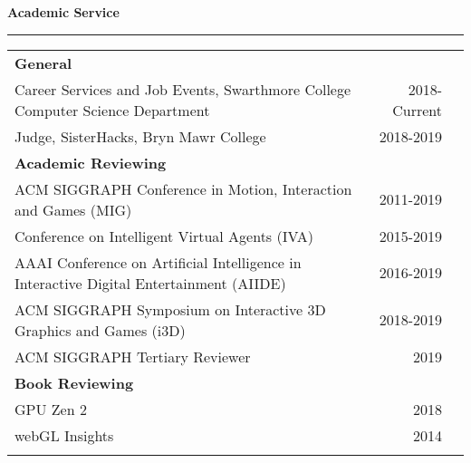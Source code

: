 \needspace{6em}
{\large {\bf Academic Service}}
\vspace{0.1cm}
\hrule
\begin{tabular*}{7.1in}{@{}l@{\extracolsep\fill}r}

{\bf General } & \\
Career Services and Job Events, Swarthmore College Computer Science Department & 2018-Current \\
Judge, SisterHacks, Bryn Mawr College & 2018-2019
\phantom{yommomma} & \phantom{2002}\\

{\bf Academic Reviewing } & \\
ACM SIGGRAPH Conference in Motion, Interaction and Games (MIG) & 2011-2019 \\
Conference on Intelligent Virtual Agents (IVA) & 2015-2019\\
AAAI Conference on Artificial Intelligence in Interactive Digital Entertainment (AIIDE) & 2016-2019 \\
ACM SIGGRAPH Symposium on Interactive 3D Graphics and Games (i3D) & 2018-2019 \\
  ACM SIGGRAPH Tertiary Reviewer & 2019
\phantom{yommomma} & \phantom{2002}\\

{\bf Book Reviewing } & \\
GPU Zen 2 & 2018 \\
webGL Insights & 2014 \\
\phantom{yommomma} & \phantom{2002}\\
\end{tabular*}


